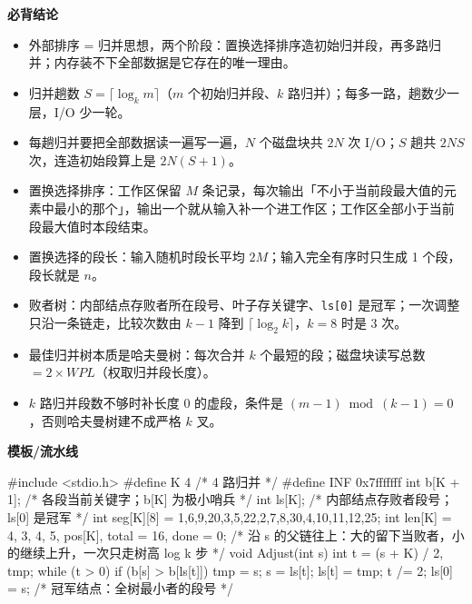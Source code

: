 \documentclass[10pt,a4paper]{ctexart}
\begin{document}



\textbf{必背结论}

\begin{itemize}

\item 外部排序 = 归并思想，两个阶段：置换选择排序造初始归并段，再多路归并；内存装不下全部数据是它存在的唯一理由。

\item 归并趟数 $S=\lceil\log_k m\rceil$（$m$ 个初始归并段、$k$ 路归并）；每多一路，趟数少一层，I/O 少一轮。

\item 每趟归并要把全部数据读一遍写一遍，$N$ 个磁盘块共 $2N$ 次 I/O；$S$ 趟共 $2NS$ 次，连造初始段算上是 $2N(S+1)$。

\item 置换选择排序：工作区保留 $M$ 条记录，每次输出「不小于当前段最大值的元素中最小的那个」，输出一个就从输入补一个进工作区；工作区全部小于当前段最大值时本段结束。

\item 置换选择的段长：输入随机时段长平均 $2M$；输入完全有序时只生成 1 个段，段长就是 $n$。

\item 败者树：内部结点存败者所在段号、叶子存关键字、\texttt{ls[0]} 是冠军；一次调整只沿一条链走，比较次数由 $k-1$ 降到 $\lceil\log_2 k\rceil$，$k=8$ 时是 3 次。

\item 最佳归并树本质是哈夫曼树：每次合并 $k$ 个最短的段；磁盘块读写总数 $=2\times WPL$（权取归并段长度）。

\item $k$ 路归并段数不够时补长度 0 的虚段，条件是 $(m-1)\bmod(k-1)=0$，否则哈夫曼树建不成严格 $k$ 叉。

\end{itemize}

\textbf{模板/流水线}

\begin{codebox}
#include <stdio.h>
#define K 4                     /* 4 路归并 */
#define INF 0x7fffffff
int b[K + 1];                   /* 各段当前关键字；b[K] 为极小哨兵 */
int ls[K];                      /* 内部结点存败者段号；ls[0] 是冠军 */
int seg[K][8] = {{1,6,9,20},{3,5,22},{2,7,8,30},{4,10,11,12,25}};
int len[K] = {4, 3, 4, 5}, pos[K], total = 16, done = 0;
/* 沿 s 的父链往上：大的留下当败者，小的继续上升，一次只走树高 log k 步 */
void Adjust(int s) {
    int t = (s + K) / 2, tmp;
    while (t > 0) {
        if (b[s] > b[ls[t]]) { tmp = s; s = ls[t]; ls[t] = tmp; }
        t /= 2;
    }
    ls[0] = s;                  /* 冠军结点：全树最小者的段号 */
}
\end{codebox}
\end{document}
